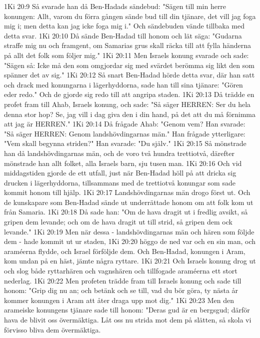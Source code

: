 1Ki 20:9  Så svarade han då Ben-Hadads sändebud: "Sägen till min herre konungen: Allt, varom du förra gången sände bud till din tjänare, det vill jag foga mig i; men detta kan jag icke foga mig i." Och sändebuden vände tillbaka med detta svar.
1Ki 20:10  Då sände Ben-Hadad till honom och lät säga: "Gudarna straffe mig nu och framgent, om Samarias grus skall räcka till att fylla händerna på allt det folk som följer mig."
1Ki 20:11  Men Israels konung svarade och sade: "Sägen så: Icke må den som omgjordar sig med svärdet berömma sig likt den som spänner det av sig."
1Ki 20:12  Så snart Ben-Hadad hörde detta svar, där han satt och drack med konungarna i lägerhyddorna, sade han till sina tjänare: "Gören eder redo." Och de gjorde sig redo till att angripa staden.
1Ki 20:13  Då trädde en profet fram till Ahab, Israels konung, och sade: "Så säger HERREN: Ser du hela denna stor hop? Se, jag vill i dag giva den i din hand, på det att du må förnimma att jag är HERREN."
1Ki 20:14  Då frågade Ahab: "Genom vem? Han svarade: "Så säger HERREN: Genom landshövdingarnas män." Han frågade ytterligare: "Vem skall begynna striden?" Han svarade: "Du själv."
1Ki 20:15  Så mönstrade han då landshövdingarnas män, och de voro två hundra trettiotvå, därefter mönstrade han allt folket, alla Israels barn, sju tusen man.
1Ki 20:16  Och vid middagstiden gjorde de ett utfall, just när Ben-Hadad höll på att dricka sig drucken i lägerhyddorna, tillsammans med de trettiotvå konungar som sade kommit honom till hjälp.
1Ki 20:17  Landshövdingarnas män drogo först ut. Och de kunskapare som Ben-Hadad sände ut underrättade honom om att folk kom ut från Samaria.
1Ki 20:18  Då sade han: "Om de hava dragit ut i fredlig avsikt, så gripen dem levande; och om de hava dragit ut till strid, så gripen dem ock levande."
1Ki 20:19  Men när dessa - landshövdingarnas män och hären som följde dem - hade kommit ut ur staden,
1Ki 20:20  höggo de ned var och en sin man, och araméerna flydde, och Israel förföljde dem. Och Ben-Hadad, konungen i Aram, kom undan på en häst, jämte några ryttare.
1Ki 20:21  Och Israels konung drog ut och slog både ryttarhären och vagnshären och tillfogade araméerna ett stort nederlag.
1Ki 20:22  Men profeten trädde fram till Israels konung och sade till honom: "Grip dig nu an; och betänk och se till, vad du bör göra, ty nästa år kommer konungen i Aram att åter draga upp mot dig."
1Ki 20:23  Men den arameiske konungens tjänare sade till honom: "Deras gud är en bergsgud; därför hava de blivit oss övermäktiga. Låt oss nu strida mot dem på slätten, så skola vi förvisso bliva dem övermäktiga.
